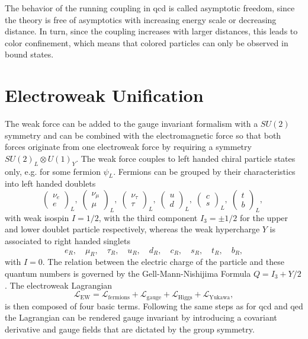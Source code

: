 The behavior of the running coupling in \ac{qcd} is called asymptotic freedom, since the theory is free of asymptotics with increasing energy scale or decreasing distance. In turn, since the coupling increases with larger distances, this leads to color confinement, which means that colored particles can only be observed in bound states.

\section{Electroweak Unification}
The weak force can be added to the gauge invariant formalism with a $SU(2)$ symmetry and can be combined with the electromagnetic force so that both forces originate from one electroweak force by requiring a symmetry $SU(2)_L \otimes U(1)_Y$. The weak force couples to left handed chiral particle states only, e.g. for some fermion $\psi_L$. Fermions can be grouped by their characteristics into left handed doublets
\begin{equation}
    \begin{pmatrix}
        \nu_e \\ e
    \end{pmatrix}_L, \;
    \begin{pmatrix}
        \nu_\mu \\ \mu
    \end{pmatrix}_L, \;
    \begin{pmatrix}
        \nu_\tau \\ \tau
    \end{pmatrix}_L, \;
    \begin{pmatrix}
        u \\ d
    \end{pmatrix}_L, \;
    \begin{pmatrix}
        c \\ s
    \end{pmatrix}_L, \;
    \begin{pmatrix}
        t \\ b
    \end{pmatrix}_L, \;
    \label{eq:weak_doublets}
\end{equation}
with weak isospin $I=1/2$, with the third component $I_3=\pm1/2$ for the upper and lower doublet particle respectively, whereas the weak hypercharge $Y$ is associated to right handed singlets
\begin{equation}
    e_R    ,\quad \mu_R ,\quad    \tau_R ,\quad    u_R,\quad d_R ,\quad    c_R ,\quad s_R ,\quad    t_R ,\quad b_R,
\end{equation}
with $I=0$. The relation between the electric charge of the particle and these quantum numbers is governed by the Gell-Mann-Nishijima Formula $Q=I_3+Y/2$. The electroweak Lagrangian
\begin{equation}
    \mathcal{L}_\mathrm{EW} = \mathcal{L}_\mathrm{fermions}+\mathcal{L}_\mathrm{gauge}+\mathcal{L}_\mathrm{Higgs}+\mathcal{L}_\mathrm{Yukawa},
    \label{eq:L_EW}
\end{equation}
is then composed of four basic terms. Following the same steps as for \ac{qcd} and \ac{qed} the Lagrangian can be rendered gauge invariant by introducing a covariant derivative and gauge fields that are dictated by the group symmetry.

